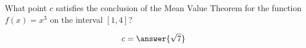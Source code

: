 \documentclass{ximera}
\author{Steven Gubkin}
\begin{document}
\begin{exercise}



What point $c$ satisfies the conclusion of the Mean Value Theorem for the function $f(x) = x^3$ on the interval
$[1,4]$?

\begin{prompt}
	$$c = \answer{\sqrt{7}}$$
\end{prompt}

\end{exercise}
\end{document}
